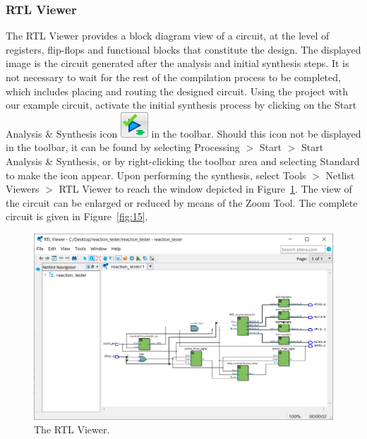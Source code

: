 \documentclass[11pt, twoside, pdftex]{article}
\begin{document}
\subsubsection{RTL Viewer}
The RTL Viewer provides a block diagram view of a circuit, at the level of registers,
flip-flops and functional blocks that constitute the design. The displayed image
is the circuit generated after the analysis and initial synthesis steps. 
It is not necessary to wait for the rest of the compilation process to be completed, 
which includes placing and routing the designed circuit.
Using the project with our example circuit, activate the initial synthesis
process by clicking on the {\sf Start Analysis \& Synthesis} 
icon \includegraphics[scale=.5]{figures/icon1.png} in the toolbar.
Should this icon not be displayed in the toolbar, it can be found by selecting 
{\sf Processing $>$ Start $>$ Start Analysis \& Synthesis}, or by right-clicking
the toolbar area and selecting {\sf Standard} to make the icon appear. Upon performing the synthesis, select
{\sf Tools $>$ Netlist Viewers $>$ RTL Viewer} to reach the window depicted in Figure~\ref{fig:14}. 
The view of the circuit can be enlarged or reduced by means of the Zoom Tool. The complete
circuit is given in Figure~\ref{fig:15}.

\begin{figure}[H]
   \begin{center}
      \includegraphics[scale=0.7]{figures/figure14.png}
   \caption{The RTL Viewer.} 
	 \label{fig:14}
	 \end{center}
\end{figure}
\end{document}
